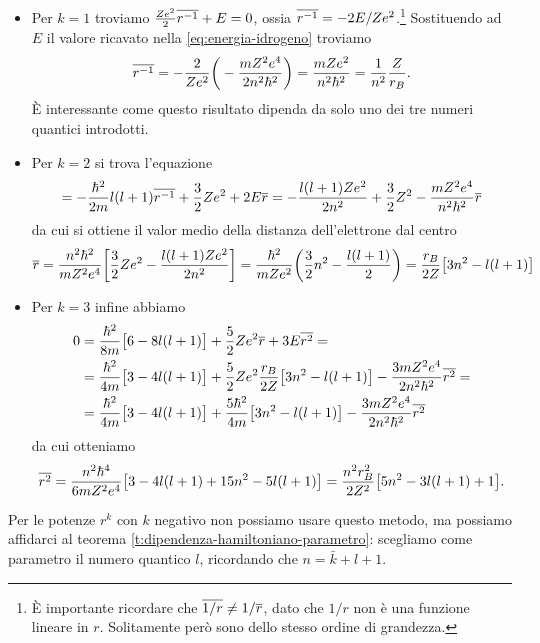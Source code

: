 \begin{itemize}
	\item Per $k=1$ troviamo $\frac{Ze^2}2\overline{r^{-1}}+E=0$, ossia $\overline{r^{-1}}=-2E/Ze^2$.\footnote{
			È importante ricordare che $\overline{1/r}\ne1/\overline{r}$, dato che $1/r$ non è una funzione lineare in $r$.
			Solitamente però sono dello stesso ordine di grandezza.
		}
		Sostituendo ad $E$ il valore ricavato nella \eqref{eq:energia-idrogeno} troviamo
		\begin{equation}
			\overline{r^{-1}}=-\frac2{Ze^2}\bigg(-\frac{mZ^2e^4}{2n^2\hbar^2}\bigg)=\frac{mZe^2}{n^2\hbar^2}=\frac1{n^2}\frac{Z}{r_B}.
		\end{equation}
		È interessante come questo risultato dipenda da solo uno dei tre numeri quantici introdotti.
	\item Per $k=2$ si trova l'equazione
		\begin{equation}
			=-\frac{\hbar^2}{2m}l(l+1)\overline{r^{-1}}+\frac32Ze^2+2E\overline{r}=-\frac{l(l+1)Ze^2}{2n^2}+\frac32Z^2-\frac{mZ^2e^4}{n^2\hbar^2}\overline{r}
		\end{equation}
		da cui si ottiene il valor medio della distanza dell'elettrone dal centro
		\begin{equation}
			\overline{r}=\frac{n^2\hbar^2}{mZ^2e^4}\bigg[\frac32Ze^2-\frac{l(l+1)Ze^2}{2n^2}\bigg]=\frac{\hbar^2}{mZe^2}\bigg(\frac32n^2-\frac{l(l+1)}2\bigg)=\frac{r_B}{2Z}\big[3n^2-l(l+1)\big]
		\end{equation}
	\item Per $k=3$ infine abbiamo
		\begin{equation}
			\begin{split}
				0&=\frac{\hbar^2}{8m}\big[6-8l(l+1)\big]+\frac52Ze^2\overline{r}+3E\overline{r^2}=\\
				&=\frac{\hbar^2}{4m}\big[3-4l(l+1)\big]+\frac52Ze^2\frac{r_B}{2Z}\big[3n^2-l(l+1)\big]-\frac{3mZ^2e^4}{2n^2\hbar^2}\overline{r^2}=\\
				&=\frac{\hbar^2}{4m}\big[3-4l(l+1)\big]+\frac{5\hbar^2}{4m}\big[3n^2-l(l+1)\big]-\frac{3mZ^2e^4}{2n^2\hbar^2}\overline{r^2}
			\end{split}
		\end{equation}
		da cui otteniamo
		\begin{equation}
			\overline{r^2}=\frac{n^2\hbar^4}{6mZ^2e^4}\big[3-4l(l+1)+15n^2-5l(l+1)\big]=\frac{n^2r_B^2}{2Z^2}\big[5n^2-3l(l+1)+1\big].
		\end{equation}
\end{itemize}
Per le potenze $r^k$ con $k$ negativo non possiamo usare questo metodo, ma possiamo affidarci al teorema \ref{t:dipendenza-hamiltoniano-parametro}: scegliamo come parametro il numero quantico $l$, ricordando che $n=\bar{k}+l+1$.
